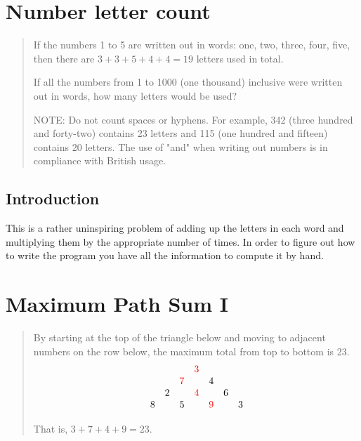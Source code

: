 \documentclass[oneside,12pt]{book}   	%
\newcounter{ex}
\newcounter{pr}
\theoremstyle{definition}
\begin{document}
\begin{spacing}{1.618}
			

	\chapter{Number letter count}
	
		\begin{quote}
			If the numbers 1 to 5 are written out in words: one, two, three, four, five, then there are $3 + 3 + 5 + 4 + 4 = 19$ letters used in total.

			If all the numbers from 1 to 1000 (one thousand) inclusive were written out in words, how many letters would be used?

			NOTE: Do not count spaces or hyphens. For example, 342 (three hundred and forty-two) contains 23 letters and 115 (one hundred and fifteen) contains 20 letters. The use of "and" when writing out numbers is in compliance with British usage.
		\end{quote}
	\section{Introduction}
		This is a rather uninspiring problem of adding up the letters in each word and multiplying them by the appropriate number of times. In order to figure out how to write the program you have all the information to compute it by hand. 
		
	\chapter{Maximum Path Sum I}
	
		\begin{quote}
			By starting at the top of the triangle below and moving to adjacent numbers on the row below, the maximum total from top to bottom is 23.
			\begin{alignat}{4}
				\begin{array}{ccccccc}
					&&&\textcolor{red}{3}&&& \\
					&&\textcolor{red}{7}&& 4&& \\
					&2&&\textcolor{red}{4}&& 6& \\
					8 && 5 && \textcolor{red}{9} && 3
				\end{array} \label{E:18:1}
			\end{alignat}

			That is, $3 + 7 + 4 + 9 = 23$.


\end{quote}
\end{spacing}
\end{document}
